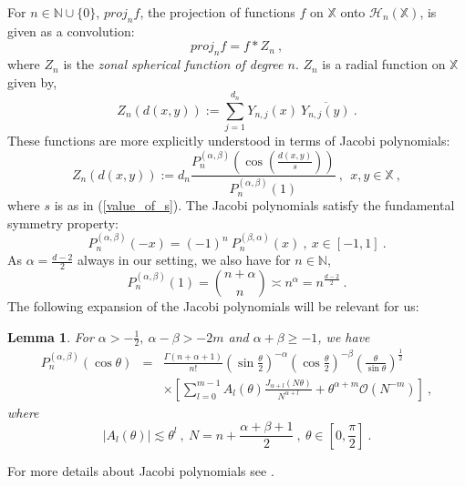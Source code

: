 \documentclass[12pt]{amsart}
\newtheorem{lemma}[theorem]{Lemma}
\theoremstyle{definition}
\newcommand{\N}{\mathbb N}%
\newcommand{\X}{\mathbb X}%
\numberwithin{equation}{section}
\begin{document}
For $n \in \N \cup \{0\}$, $proj_nf$, the projection of functions $f$ on $\X$ onto $\mathscr{H}_n(\X)$, is given as a convolution:
\begin{equation} \label{projection_as_convolution}
proj_nf=f*Z_n\:,
\end{equation}
where $Z_n$ is the {\em zonal spherical function of degree $n$}. $Z_n$ is a radial function on $\X$ given by,
\begin{equation*}
Z_n(d(x,y)):=\sum_{j=1}^{d_n} Y_{n,j}(x)\:\overline{Y_{n,j}(y)}\:.
\end{equation*}
These functions are more explicitly understood in terms of Jacobi polynomials:
\begin{equation} \label{in_terms_jacobi}
Z_n(d(x,y)):= d_n \frac{P^{(\alpha,\beta)}_n{\left(\cos\left(\frac{d(x,y)}{s}\right)\right)}}{P^{(\alpha,\beta)}_n(1)}\:,\:\:x,y \in \X\:,
\end{equation}
where $s$ is as in (\ref{value_of_s}).  The Jacobi polynomials satisfy the fundamental symmetry property:
\begin{equation} \label{jacobi_symmetry}
P^{(\alpha,\beta)}_n(-x)=(-1)^n\:P^{(\beta,\alpha)}_n(x)\:,\: x\in [-1,1]\:.
\end{equation}
As $\alpha=\frac{d-2}{2}$ always in our setting, we also have for $n \in \N$,
\begin{equation} \label{jacobi_at_1}
P^{(\alpha,\beta)}_n(1) = {n+\alpha \choose n} \asymp n^\alpha=n^{\frac{d-2}{2}}\:.
\end{equation}
The following expansion of the Jacobi polynomials will be relevant for us:
\begin{lemma} \cite{Frenzen}\label{frenzen}
For $\alpha>-\frac{1}{2},\:\alpha-\beta>-2m$ and $\alpha +\beta \ge -1$, we have
\begin{eqnarray*}
P^{(\alpha,\beta)}_n(\cos \theta)&=&\frac{\Gamma(n+\alpha+1)}{n!}\left(\sin\frac{\theta}{2}\right)^{-\alpha}\left(\cos\frac{\theta}{2}\right)^{-\beta}\left(\frac{\theta}{\sin\theta}\right)^{\frac{1}{2}}\\
&& \times\left[\sum_{l=0}^{m-1} A_l(\theta)\frac{J_{\alpha + l}(N \theta)}{N^{\alpha+l}}+\theta^{\alpha + m} \mathcal{O}\left(N^{-m}\right)\right]\:,
\end{eqnarray*}
where 
\begin{equation*}
\left|A_l(\theta)\right| \lesssim \theta^l\:,\:N=n+\frac{\alpha + \beta +1}{2}\:,\:\theta \in \left[0,\frac{\pi}{2}\right]\:.
\end{equation*}
\end{lemma}
For more details about Jacobi polynomials see \cite{Szego}.
\end{document}

